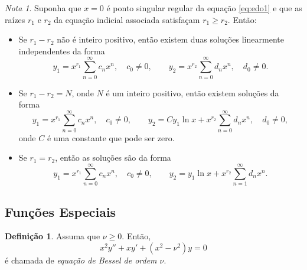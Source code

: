 \documentclass{article}
\theoremstyle{plain}
\theoremstyle{definition}
\newtheorem{defn}{Definição}[section]
\theoremstyle{remark}
\newtheorem*{rem}{Nota}
\begin{document}
\begin{rem}
    Suponha que \(x=0\) é ponto singular regular da equação \eqref{eq:edo1} e que as raízes \(r_1\) e \(r_2\) da equação indicial associada satisfaçam \(r_1 \geq r_2\). Então:
    \begin{itemize}
        \item [\textbf{Caso I.}] Se \(r_1 - r_2\) não é inteiro positivo, então existem duas soluções linearmente independentes da forma
        \begin{equation}
            y_1 = x^{r_1} \sum_{n=0}^{\infty} c_n x^n, \quad c_0 \neq 0, \qquad y_2 = x^{r_2} \sum_{n=0}^{\infty} d_n x^n, \quad d_0 \neq 0.
        \end{equation}
        \item [\textbf{Caso II.}] Se \(r_1 - r_2 = N\), onde \(N\) é um inteiro positivo, então existem soluções da forma
        \begin{equation}
            y_1 = x^{r_1} \sum_{n=0}^{\infty} c_n x^n, \quad c_0 \neq 0, \qquad y_2 = C y_1 \ln x + x^{r_2} \sum_{n=0}^{\infty} d_n x^n, \quad d_0 \neq 0,
        \end{equation}
        \noindent onde \(C\) é uma constante que pode ser zero.
        \item [\textbf{Caso III.}] Se \(r_1 = r_2\), então as soluções são da forma
        \begin{equation}
            y_1 = x^{r_1} \sum_{n=0}^{\infty} c_n x^n, \quad c_0 \neq 0, \qquad y_2 = y_1 \ln x + x^{r_2} \sum_{n=1}^{\infty} d_n x^n.
        \end{equation}
    \end{itemize}
\end{rem}

\subsection{Funções Especiais}

\begin{defn}
    Assuma que \(\nu\geq0\). Então,
    \begin{equation}\label{eq:bessel}
        x^2y'' + xy' + (x^2 - \nu^2)y = 0
    \end{equation}
    \noindent é chamada de \emph{equação de Bessel de ordem \(\nu\)}.
\end{defn}
\end{document}
